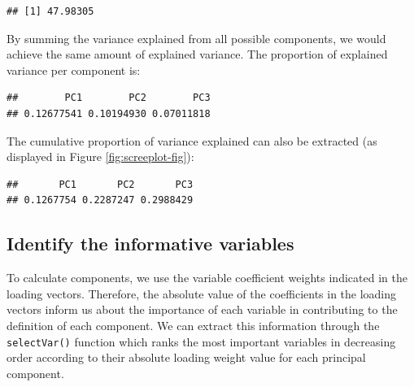\documentclass[]{book}
\newenvironment{Shaded}{\begin{snugshade}}{\end{snugshade}}
\newcommand{\CommentTok}[1]{\textcolor[rgb]{0.56,0.35,0.01}{\textit{#1}}}
\newcommand{\DataTypeTok}[1]{\textcolor[rgb]{0.13,0.29,0.53}{#1}}
\newcommand{\DecValTok}[1]{\textcolor[rgb]{0.00,0.00,0.81}{#1}}
\newcommand{\KeywordTok}[1]{\textcolor[rgb]{0.13,0.29,0.53}{\textbf{#1}}}
\newcommand{\NormalTok}[1]{#1}
\newcommand{\OperatorTok}[1]{\textcolor[rgb]{0.81,0.36,0.00}{\textbf{#1}}}
\begin{document}
\begin{verbatim}
## [1] 47.98305
\end{verbatim}

By summing the variance explained from all possible components, we would achieve the same amount of explained variance. The proportion of explained variance per component is:

\begin{Shaded}
\end{Shaded}

\begin{verbatim}
##        PC1        PC2        PC3 
## 0.12677541 0.10194930 0.07011818
\end{verbatim}

The cumulative proportion of variance explained can also be extracted (as displayed in Figure \ref{fig:screeplot-fig}):

\begin{Shaded}
\end{Shaded}

\begin{verbatim}
##       PC1       PC2       PC3 
## 0.1267754 0.2287247 0.2988429
\end{verbatim}

\hypertarget{identify-the-informative-variables}{%
\subsection{Identify the informative variables}\label{identify-the-informative-variables}}

To calculate components, we use the variable coefficient weights indicated in the loading vectors. Therefore, the absolute value of the coefficients in the loading vectors inform us about the importance of each variable in contributing to the definition of each component. We can extract this information through the \texttt{selectVar()} function which ranks the most important variables in decreasing order according to their absolute loading weight value for each principal component.

\begin{Shaded}
\end{Shaded}
\end{document}
